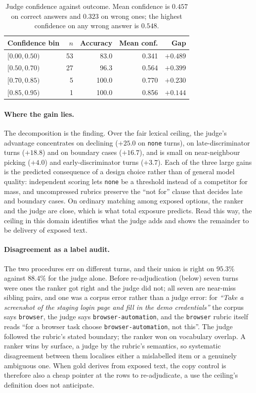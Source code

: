 \begin{table}[t]\centering\small
\caption{Judge confidence against outcome. Mean confidence is $0.457$ on correct answers and $0.323$
on wrong ones; the highest confidence on any wrong answer is $0.548$.}
\label{tab:routing-calib}
\begin{tabular}{lrrrr}
\toprule
Confidence bin & $n$ & Accuracy & Mean conf. & Gap \\
\midrule
$[0.00,0.50)$ & 53 & 83.0  & 0.341 & $+0.489$ \\
$[0.50,0.70)$ & 27 & 96.3  & 0.564 & $+0.399$ \\
$[0.70,0.85)$ & 5  & 100.0 & 0.770 & $+0.230$ \\
$[0.85,0.95)$ & 1  & 100.0 & 0.856 & $+0.144$ \\
\bottomrule
\end{tabular}
\end{table}

\paragraph{Where the gain lies.} The decomposition is the finding. Over the fair lexical ceiling, the judge's advantage concentrates on declining ($+25.0$ on \texttt{none} turns), on late-discriminator turns ($+18.8$) and on boundary cases ($+16.7$), and is small on near-neighbour picking ($+4.0$) and early-discriminator turns ($+3.7$). Each of the three large gains is the predicted consequence of a design choice rather than of general model quality: independent scoring lets \texttt{none} be a threshold instead of a competitor for mass, and uncompressed rubrics preserve the ``not for'' clause that decides late and boundary cases. On ordinary matching among exposed options, the ranker and the judge are close, which is what total exposure predicts. Read this way, the ceiling in this domain identifies what the judge adds and shows the remainder to be delivery of exposed text.

\paragraph{Disagreement as a label audit.} The two procedures err on different turns, and their union is right on $95.3\%$ against $88.4\%$ for the judge alone. Before re-adjudication (below) seven turns were ones the ranker got right and the judge did not; all seven are near-miss sibling pairs, and one was a corpus error rather than a judge error: for \emph{``Take a screenshot of the staging login page and fill in the demo credentials''} the corpus says \texttt{browser}, the judge says \texttt{browser-automation}, and the \texttt{browser} rubric itself reads ``for a browser task choose \texttt{browser-automation}, not this''. The judge followed the rubric's stated boundary; the ranker won on vocabulary overlap. A ranker wins by surface, a judge by the rubric's semantics, so systematic disagreement between them localises either a mislabelled item or a genuinely ambiguous one. When gold derives from exposed text, the copy control is therefore also a cheap pointer at the rows to re-adjudicate, a use the ceiling's definition does not anticipate.

